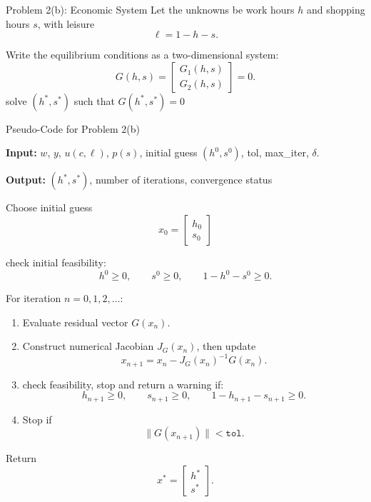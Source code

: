 \documentclass[9pt]{beamer}
\begin{document}
\begin{frame}{Problem 2(b): Economic System}
Let the unknowns be work hours $h$ and shopping hours $s$, with leisure
\[
\ell = 1-h-s.
\]

Write the equilibrium conditions as a two-dimensional system:
\[
G(h,s)=
\begin{bmatrix}
G_1(h,s)\\[0.3em]
G_2(h,s)
\end{bmatrix}
=
0.
\]
solve $(h^*,s^*)$ such that $G(h^*,s^*) = 0$

\end{frame}


\begin{frame}{Pseudo-Code for Problem 2(b)}
\small

\textbf{Input:} $w$, $y$, $u(c,\ell)$, $p(s)$, initial guess $(h^0,s^0)$, tol, max\_iter, $\delta$.

\textbf{Output:} $(h^*, s^*)$, number of iterations, convergence status

Choose initial guess
\[
x_0=
\begin{bmatrix}
h_0\\
s_0
\end{bmatrix}
\]

check initial feasibility:
\[
h^0 \ge 0,\qquad s^0 \ge 0,\qquad 1-h^0-s^0 \ge 0.
\]

For iteration $n=0,1,2,\dots$:
\begin{enumerate}
    \item Evaluate residual vector $G(x_n)$.
    \item Construct numerical Jacobian $J_G(x_n)$, then update
    \[
    x_{n+1}=x_n - J_G(x_n)^{-1} G(x_n).
    \]
    \item check feasibility, stop and return a warning if:
    \[
    h_{n+1} \ge 0,\qquad s_{n+1} \ge 0,\qquad 1-h_{n+1}-s_{n+1} \ge 0.
    \]
    \item Stop if
    \[
    \|G(x_{n+1})\|<\texttt{tol}.
    \]
\end{enumerate}
Return
\[
x^*=
\begin{bmatrix}
h^*\\
s^*
\end{bmatrix}.
\]

\end{frame}
\end{document}
